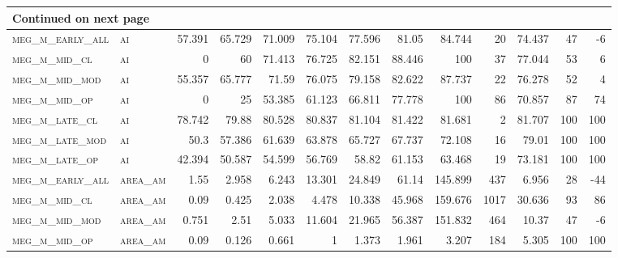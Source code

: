 \begin{landscape}
\begin{center}
\begin{footnotesize}
\begin{longtable}{llrrrrrrrr|rrr}
\hline \multicolumn{13}{|l|}{{Continued on next page}} \\ \hline
\endfoot

\hline \hline
\endlastfoot

\textsc{meg\_m\_early\_all} & \textsc{ai        }   & 57.391   & 65.729   & 71.009   & 75.104   & 77.596   & 81.05    & 84.744    & 20     & 74.437        & 47            & -6              \\
\textsc{meg\_m\_mid\_cl   } & \textsc{ai        }   & 0        & 60       & 71.413   & 76.725   & 82.151   & 88.446   & 100       & 37     & 77.044        & 53            & 6               \\
\textsc{meg\_m\_mid\_mod  } & \textsc{ai        }   & 55.357   & 65.777   & 71.59    & 76.075   & 79.158   & 82.622   & 87.737    & 22     & 76.278        & 52            & 4               \\
\textsc{meg\_m\_mid\_op   } & \textsc{ai        }   & 0        & 25       & 53.385   & 61.123   & 66.811   & 77.778   & 100       & 86     & 70.857        & 87            & 74              \\
\textsc{meg\_m\_late\_cl  } & \textsc{ai        }   & 78.742   & 79.88    & 80.528   & 80.837   & 81.104   & 81.422   & 81.681    & 2      & 81.707        & 100           & 100             \\
\textsc{meg\_m\_late\_mod } & \textsc{ai        }   & 50.3     & 57.386   & 61.639   & 63.878   & 65.727   & 67.737   & 72.108    & 16     & 79.01         & 100           & 100             \\
\textsc{meg\_m\_late\_op  } & \textsc{ai        }   & 42.394   & 50.587   & 54.599   & 56.769   & 58.82    & 61.153   & 63.468    & 19     & 73.181        & 100           & 100             \\
\textsc{meg\_m\_early\_all} & \textsc{area\_am  }   & 1.55     & 2.958    & 6.243    & 13.301   & 24.849   & 61.14    & 145.899   & 437    & 6.956         & 28            & -44             \\
\textsc{meg\_m\_mid\_cl   } & \textsc{area\_am  }   & 0.09     & 0.425    & 2.038    & 4.478    & 10.338   & 45.968   & 159.676   & 1017   & 30.636        & 93            & 86              \\
\textsc{meg\_m\_mid\_mod  } & \textsc{area\_am  }   & 0.751    & 2.51     & 5.033    & 11.604   & 21.965   & 56.387   & 151.832   & 464    & 10.37         & 47            & -6              \\
\textsc{meg\_m\_mid\_op   } & \textsc{area\_am  }   & 0.09     & 0.126    & 0.661    & 1        & 1.373    & 1.961    & 3.207     & 184    & 5.305         & 100           & 100             \\

\end{longtable}
\end{footnotesize}
\end{center}
\end{landscape}
